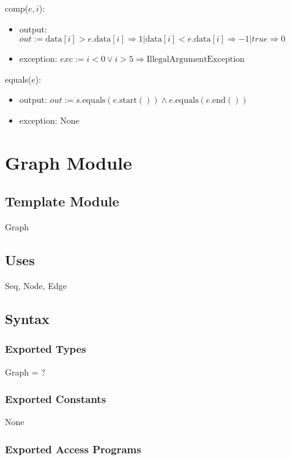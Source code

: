 \documentclass[12pt]{article}
\begin{document}
\noindent comp($e, i$):
\begin{itemize}
	\item output: $out := \mbox{data}[i] > e.\mbox{data}[i] \Rightarrow 1 | \mbox{data}[i] < e.\mbox{data}[i] \Rightarrow -1 | true \Rightarrow 0$
	\item exception: $exc := i < 0 \lor i > 5 \Rightarrow \text{IllegalArgumentException}$
\end{itemize}

\noindent equals($e$):
\begin{itemize}
	\item output: $out := \textit{s}.\mbox{equals}(e.\mbox{start}()) \land \textit{e}.\mbox{equals}(e.\mbox{end}())$
	\item exception: None
\end{itemize}

\newpage

\section{Graph Module}

\subsection*{Template Module}

Graph

\subsection*{Uses}

Seq, Node, Edge

\subsection*{Syntax}

\subsubsection*{Exported Types}

Graph = ?

\subsubsection* {Exported Constants}

None

\subsubsection*{Exported Access Programs}
\end{document}
